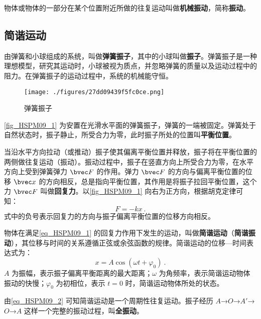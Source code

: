 

物体或物体的一部分在某个位置附近所做的往复运动叫做\textbf{机械振动}，简称\textbf{振动}。

\subsection{简谐运动}

由弹簧和小球组成的系统，叫做\textbf{弹簧振子}，其中的小球叫做\textbf{振子}。弹簧振子是一种理想模型，研究其运动时，小球被视为质点，并忽略弹簧的质量以及运动过程中的阻力。在弹簧振子的运动过程中，系统的机械能守恒。

\begin{figure}[ht]
\centering
\texttt{[image: ./figures/27dd09439f5fc0ce.png]}
\caption{弹簧振子} \label{fig_HSPM09_1}
\end{figure}

\autoref{fig_HSPM09_1} 为安置在光滑水平面的弹簧振子，弹簧的一端被固定。弹簧处于自然状态时，振子静止，所受合力为零，此时振子所处的位置叫\textbf{平衡位置}。

当沿水平方向拉动（或推动）振子使其偏离平衡位置并释放，振子将在平衡位置的两侧做往复运动（振动）。振动过程中，振子在竖直方向上所受合力为零，在水平方向上受到弹簧弹力 $\bvec F$ 的作用。弹力 $\bvec F$ 的方向与偏离平衡位置的位移 $\bvec x$ 的方向相反，总是指向平衡位置，其作用是将振子拉回平衡位置，这个力 $\bvec F$ 叫做\textbf{回复力}。以\autoref{fig_HSPM09_1} 向右为正方向，根据胡克定律可知：
\begin{equation}\label{eq_HSPM09_1}
F=-kx~.
\end{equation}
式中的负号表示回复力的方向与振子偏离平衡位置的位移方向相反。

物体在满足\autoref{eq_HSPM09_1} 的回复力作用下发生的运动，叫做\textbf{简谐运动}（\textbf{简谐振动}），其位移与时间的关系遵循正弦或余弦函数的规律。简谐运动的位移—时间表达式为：
\begin{equation}\label{eq_HSPM09_2}
x=A\cos(\omega t + \varphi_0)~.
\end{equation}
$A$ 为振幅，表示振子偏离平衡距离的最大距离；$\omega$ 为角频率，表示简谐运动物体振动的快慢；$\varphi_0$ 为初相位，表示 $t=0$ 时，简谐运动物体所处的状态。

由\autoref{eq_HSPM09_2} 可知简谐运动是一个周期性往复运动。振子经历 $A$→$O$→$A'$→$O$→$A$ 这样一个完整的振动过程，叫\textbf{全振动}。

